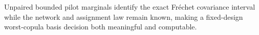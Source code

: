 Unpaired bounded pilot marginals identify the exact Fr\'echet covariance interval while the network and assignment law remain known, making a fixed-design worst-copula basis decision both meaningful and computable.